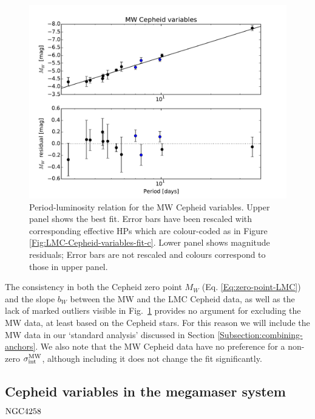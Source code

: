 \begin{figure}[tbp]
\centering %
\includegraphics[scale=0.75]{figures/chapter-h0/effective_HP_cepheids_MW.pdf} 
\caption{Period-luminosity relation for the MW Cepheid variables. Upper panel shows the best fit. Error bars have been rescaled with corresponding effective HPs which are colour-coded as in Figure \ref{Fig:LMC-Cepheid-variables-fit-c}. Lower panel shows magnitude residuals; Error bars are not rescaled and colours correspond to those in upper panel.}
\label{Fig:MW-Cepheid-variables}
\end{figure}

The consistency in both the Cepheid zero point $M_W$ (Eq. \eqref{Eq:zero-point-LMC}) and the slope $b_W$ between the MW and the LMC Cepheid data, as well as the lack of marked outliers visible in Fig.\ \ref{Fig:MW-Cepheid-variables} provides no argument for excluding the MW data, at least based on the Cepheid stars. For this reason we will include the MW data in our `standard analysis' discussed in Section \ref{Subsection:combining-anchors}. We also note that the MW Cepheid data have no preference for a non-zero $\sigma^{\mathrm{MW}}_{\mathrm{int}}$, although including it does not change the fit significantly.

\subsection{Cepheid variables in the megamaser system $\mathrm{NGC4258}$}
\label{Subsection:NGC4258}

